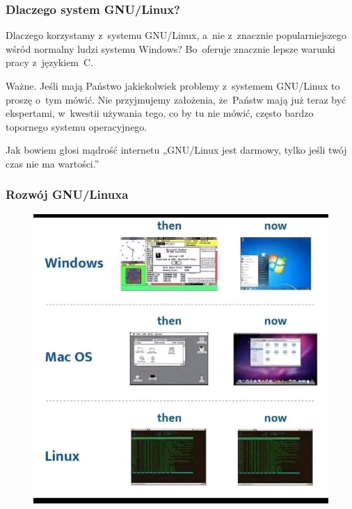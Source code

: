 \documentclass[10pt,t]{beamer}
\begin{document}
\begin{frame}
  \frametitle{Dlaczego system GNU/Linux?}


  Dlaczego korzystamy z~systemu GNU/Linux, a~nie z~znacznie
  popularniejszego wśród normalny ludzi systemu Windows? Bo~oferuje
  znacznie lepsze warunki pracy z~językiem~C.

  \alert{Ważne.} Jeśli mają Państwo jakiekolwiek problemy z~systemem
  GNU/Linux to proszę o~tym \alert{mówić}. Nie przyjmujemy założenia,
  że~Państw mają już teraz być ekspertami, w~kwestii używania tego, co by
  tu nie mówić, często bardzo topornego systemu operacyjnego.

  Jak bowiem głosi mądrość internetu „GNU/Linux jest darmowy, tylko jeśli
  twój czas nie ma wartości.”

\end{frame}





\begin{frame}
  \frametitle{Rozwój GNU/Linuxa}

  \vspace{-0.5em}


  \begin{figure}

    \label{fig:Evolution-of-OS}

    \centering


    \includegraphics[scale=0.3]
    {./Presentations-pictures/Evolution-of-operating-systems.jpg}

  \end{figure}

\end{frame}
\end{document}
